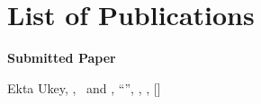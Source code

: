 \chapter*{List of Publications}

\textbf{Submitted Paper}

\vspace{10pt}
\noindent
\begin{minipage}{\textwidth}
Ekta Ukey, \StudentOne, \StudentTwo\ and \StudentThree,
``\ProjectTitleFormatted'',
\ConferenceName, \ConferenceYear, [\PaperStatus]
\end{minipage}
